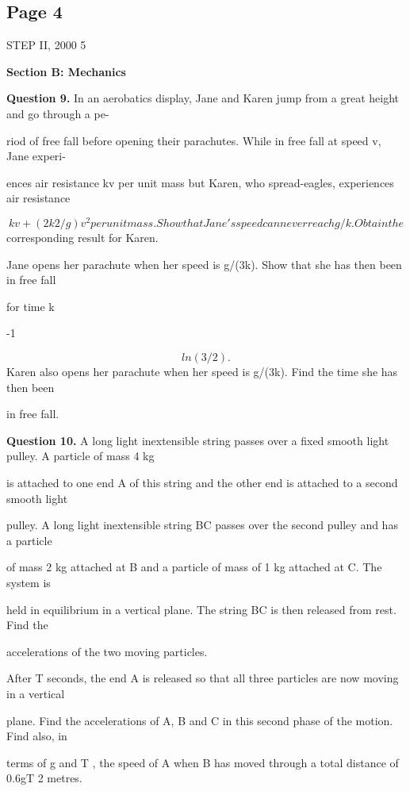 \documentclass[12pt]{article}
\begin{document}
\subsection*{Page 4}
\begin{flushleft}
STEP II, 2000 5\par
\bigskip\textbf{Section B: Mechanics}\par
\bigskip\textbf{Question 9.} In an aerobatics display, Jane and Karen jump from a great height and go through a pe-\par
riod of free fall before opening their parachutes. While in free fall at speed v, Jane experi-\par
ences air resistance kv per unit mass but Karen, who spread-eagles, experiences air resistance\par
\[kv + (2k2/g)v^2 per unit mass. Show that Jane's speed can never reach g/k. Obtain the\]
corresponding result for Karen.\par
Jane opens her parachute when her speed is g/(3k). Show that she has then been in free fall\par
for time k\par
-1\par
\[ln(3/2).\]
Karen also opens her parachute when her speed is g/(3k). Find the time she has then been\par
in free fall.\par
\bigskip\textbf{Question 10.} A long light inextensible string passes over a fixed smooth light pulley. A particle of mass 4 kg\par
is attached to one end A of this string and the other end is attached to a second smooth light\par
pulley. A long light inextensible string BC passes over the second pulley and has a particle\par
of mass 2 kg attached at B and a particle of mass of 1 kg attached at C. The system is\par
held in equilibrium in a vertical plane. The string BC is then released from rest. Find the\par
accelerations of the two moving particles.\par
After T seconds, the end A is released so that all three particles are now moving in a vertical\par
plane. Find the accelerations of A, B and C in this second phase of the motion. Find also, in\par
terms of g and T , the speed of A when B has moved through a total distance of 0.6gT 2 metres.\par

\end{flushleft}
\end{document}
